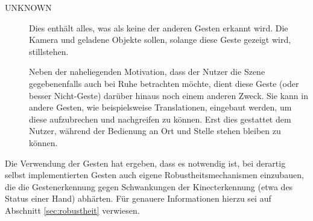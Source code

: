 \begin{description}
		\par		
		\item[UNKNOWN] Dies enthält alles, was als keine der anderen Gesten erkannt wird. Die Kamera und geladene Objekte sollen, solange diese Geste gezeigt wird, stillstehen.\par
		Neben der naheliegenden Motivation, dass der Nutzer die Szene gegebenenfalls auch bei Ruhe betrachten möchte, dient diese \glqq Geste\grqq{} (oder besser \glqq Nicht-Geste\grqq{}) darüber hinaus noch einem anderen Zweck. Sie kann in andere Gesten, wie beispielsweise Translationen, eingebaut werden, um diese aufzubrechen und \glqq nachgreifen\grqq{} zu können. Erst dies gestattet dem Nutzer, während der Bedienung an Ort und Stelle stehen bleiben zu können.
	\end{description}
	Die Verwendung der Gesten hat ergeben, dass es notwendig ist, bei derartig selbst implementierten Gesten auch eigene Robustheitsmechanismen einzubauen, die die Gestenerkennung gegen Schwankungen der Kinecterkennung (etwa des Status einer Hand) abhärten. Für genauere Informationen hierzu sei auf Abschnitt \ref{sec:robustheit} verwiesen.